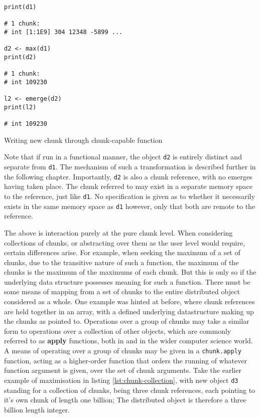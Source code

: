 \begin{listing}
    \begin{verbatim}
print(d1)

# 1 chunk:
# int [1:1E9] 304 12348 -5899 ...

d2 <- max(d1)
print(d2)

# 1 chunk:
# int 109230

l2 <- emerge(d2)
print(l2)

# int 109230
    \end{verbatim}
    \caption{Writing new chunk through chunk-capable function}
    \label{lst:write-chunk}
\end{listing}

Note that if run in a functional manner, the object \texttt{d2} is
entirely distinct and separate from \texttt{d1}. The mechanism of such a
transformation is described further in the following chapter.
Importantly, \texttt{d2} is also a chunk reference, with no emerges
having taken place. The chunk referred to may exist in a separate memory
space to the reference, just like \texttt{d1}. No specification is given
as to whether it necessarily exists in the same memory space as
\texttt{d1} however, only that both are remote to the reference.

The above is interaction purely at the pure chunk level. When
considering collections of chunks, or abstracting over them as the user
level would require, certain differences arise. For example, when
seeking the maximum of a set of chunks, due to the transitive nature of
such a function, the maximum of the chunks is the maximum of the
maximums of each chunk. But this is only so if the underlying data
structure possesses meaning for such a function. There must be some
means of mapping from a set of chunks to the entire distributed object
considered as a whole. One example was hinted at before, where chunk
references are held together in an array, with a defined underlying
datastructure making up the chunks as pointed to. Operations over a
group of chunks may take a similar form to operations over a collection
of other objects, which are commonly referred to as \textbf{apply}
functions, both in \R and in the wider computer science world. A means of
operating over a group of chunks may be given in a \texttt{chunk.apply}
function, acting as a higher-order function that orders the running of
whatever function argument is given, over the set of chunk arguments.
Take the earlier example of maximisation in listing \cref{lst:chunk-collection}, with new object \texttt{d3}
standing for a collection of chunks, being three chunk references, each
pointing to it's own chunk of length one billion; The distributed object
is therefore a three billion length integer.

